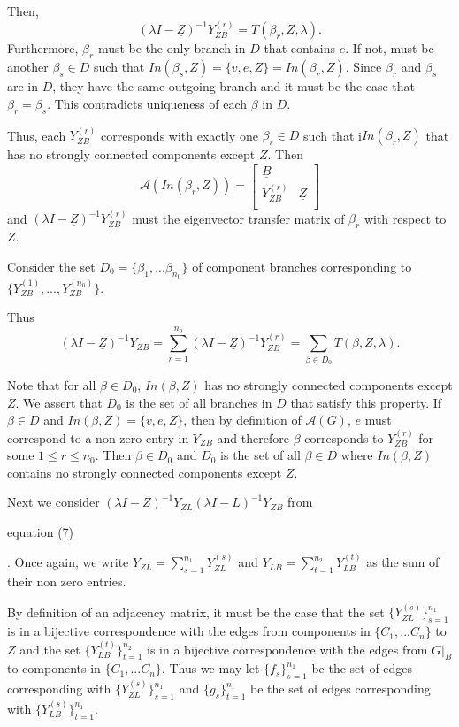 \documentclass{paper}
\begin{document}
Then,
\[(\lambda I - \underline{Z})^{-1} Y_{ZB}^{(r)} = T(\beta_r,Z,\lambda).
\]
Furthermore, $\beta_r$ must be the only branch in $D$ that contains $e$. If not, must be another $\beta_s \in D$ such that $In(\beta_s,Z) =    \{v,e,Z\} = In(\beta_r,Z)$. Since $\beta_r$ and $\beta_s$ are in $D$, they have the same outgoing branch and it must be the case that $\beta_r = \beta_s$. This contradicts uniqueness of each $\beta$ in $D$.

Thus, each $Y_{ZB}^{(r)}$ corresponds with exactly one $\beta_r \in D$ such that i$In(\beta_r,Z)$ that has no strongly connected components except $Z$. Then
\[
\mathcal{A}(In(\beta_r,Z))
=
\begin{bmatrix}
\underline{B}\\
Y_{ZB}^{(r)} & \underline{Z} \\
\end{bmatrix}
\] and  $(\lambda I - \underline{Z})^{-1} Y_{ZB}^{(r)}$ must the eigenvector transfer matrix of $\beta_r$ with respect to $Z$.


Consider the set $D_0 = \{\beta_1, ... \beta_{n_0} \}$ of component branches corresponding to $\{Y_{ZB}^{(1)}, ..., Y_{ZB}^{(n_0)} \}$. 


Thus
\begin{equation}
(\lambda I - \underline{Z})^{-1}Y_{ZB} = \sum_{r=1}^{n_o}(\lambda I - \underline{Z})^{-1} Y_{ZB}^{(r)} = \sum_{\beta \in D_0} T(\beta,Z,\lambda).
\end{equation}

Note that for all $\beta \in D_0$, $In(\beta,Z)$ has no strongly connected components except $Z$. 
We assert that $D_0$ is the set of all branches in $D$ that satisfy this property. 
If $\beta \in D$ and $In(\beta,Z) = \{v,e,Z\}$, then by definition of $\mathcal{A}(G)$, $e$ must correspond to a non zero entry in $Y_{ZB}$ and therefore $\beta$ corresponds to $Y_{ZB}^{(r)}$ for some $1 \leq r \leq n_0$. Then $\beta \in D_0$ and $D_0$ is the set of all $\beta \in D$ where $In(\beta,Z)$ contains no strongly connected components except $Z$.

Next we consider $(\lambda	I - \underline{Z})^{-1}Y_{ZL} (\lambda I - L)^{-1}Y_{ZB}$ from \begin{bf} equation (7) \end{bf}. Once again, we write $Y_{ZL} = \sum_{s=1}^{n_1}Y_{ZL}^{(s)}$ and $Y_{LB}=\sum_{t=1}^{n_2}Y_{LB}^{(t)}$ as the sum of their non zero entries. 

By definition of an adjacency matrix, it must be the case that the set $\{Y_{ZL}^{(s)} \}_{s=1}^{n_1}$ is in a bijective correspondence with the edges from components in $\{C_1, ... C_n\}$ to $Z$ 
and the set $\{Y_{LB}^{(t)} \}_{t=1}^{n_2}$ is in a bijective correspondence with the edges from $G|_B$ to components in $\{C_1, ... C_n\}$. 
Thus we may let $\{f_s\}_{s=1}^{n_1}$ be the set of edges corresponding with $\{Y_{ZL}^{(s)} \}_{s=1}^{n_1}$ 
and $\{g_s\}_{t=1}^{n_1}$ be the set of edges corresponding with $\{Y_{LB}^{(s)} \}_{t=1}^{n_1}$.
\end{document}
